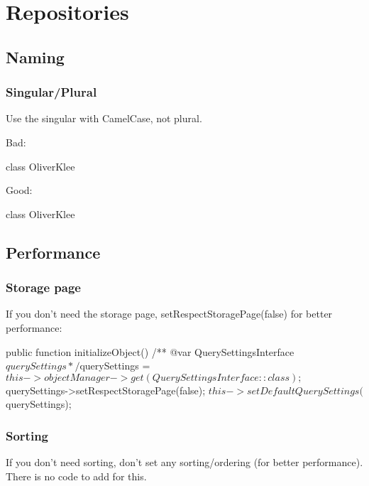 \chapter{Repositories}


\section{Naming}

\subsection{Singular/Plural}

Use the singular with CamelCase, not plural.

Bad:

\begin{phpcode}
class OliverKlee\Books\Domain\Repository{}
\end{phpcode}

Good:

\begin{phpcode}
class OliverKlee\Books\Domain\Repository{}
\end{phpcode}


\section{Performance}


\subsection{Storage page}
If you don’t need the storage page, setRespectStoragePage(false) for better performance:

\begin{phpcode}
public function initializeObject()
{
  /** @var QuerySettingsInterface $querySettings */
  $querySettings = $this->objectManager->get(QuerySettingsInterface::class);
  $querySettings->setRespectStoragePage(false);
  $this->setDefaultQuerySettings($querySettings);
}
\end{phpcode}


\subsection{Sorting}

If you don’t need sorting, don’t set any sorting/ordering (for better performance). There is no code to add for this.


